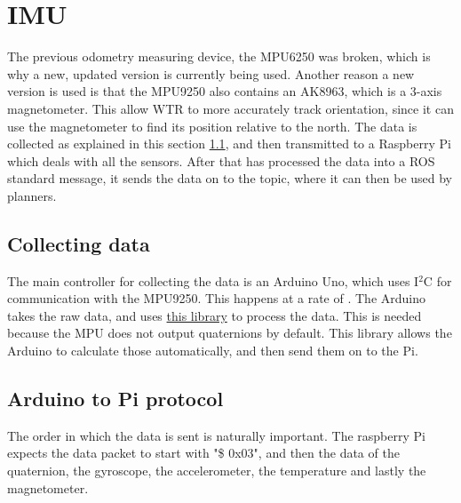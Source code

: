 \section{IMU}
The previous odometry measuring device, the MPU6250 \cite{mpu6250} was broken, which is why a new, updated version is currently being used.
Another reason a new version is used is that the MPU9250 \cite{MPU9250} also contains an AK8963, which is a 3-axis magnetometer.
This allow WTR to more accurately track orientation, since it can use the magnetometer to find its position relative to the north.
The data is collected as explained in this section \ref{sec::collect}, and then transmitted to a Raspberry Pi which deals with all the sensors.
After that has processed the data into a ROS standard message, it sends the data on to the topic, where it can then be used by planners.

\subsection{Collecting data} \label{sec::collect}
The main controller for collecting the data is an Arduino Uno, which uses I$^{2}$C for communication with the MPU9250.
This happens at a rate of .
The Arduino takes the raw data, and uses \href{https://github.com/sparkfun/SparkFun_MPU-9250_Breakout_Arduino_Library}{this library} to process the data.
This is needed because the MPU does not output quaternions by default.
This library allows the Arduino to calculate those automatically, and then send them on to the Pi.

\subsection{Arduino to Pi protocol}
The order in which the data is sent is naturally important.
The raspberry Pi expects the data packet to start with "\$ 0x03", and then the data of the quaternion, the gyroscope, the accelerometer, the temperature and lastly the magnetometer. 


